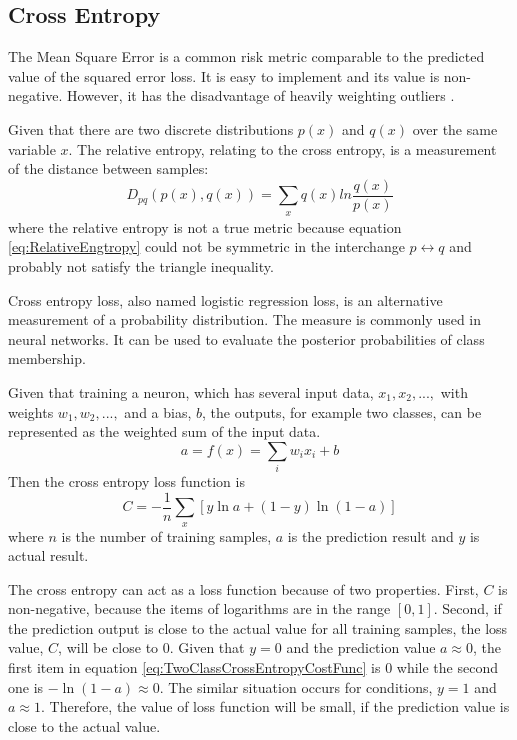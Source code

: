 \subsection{Cross Entropy}

The Mean Square Error is a common risk metric comparable to the predicted value of the squared error loss. It is easy to implement and its value is non-negative. However, it has the disadvantage of heavily weighting outliers \citep{bermejo2001oriented}.

Given that there are two discrete distributions $p(x)$ and $q(x)$ over the same variable $x$. The relative entropy, relating to the cross entropy, is a measurement of the distance between samples:
\begin{equation}\label{eq:RelativeEngtropy}
D_{pq}(p(x), q(x)) = \sum_{\substack{x}}q(x)ln\frac{q(x)}{p(x)}
\end{equation}
where the relative entropy is not a true metric because equation \ref{eq:RelativeEngtropy} could not be symmetric in the interchange $p \leftrightarrow q$ and probably not satisfy the triangle inequality.

Cross entropy loss, also named logistic regression loss, is an alternative measurement of a probability distribution. The measure is commonly used in neural networks. It can be used to evaluate the posterior probabilities of class membership.

Given that training a neuron, which has several input data, $x_{1}, x_{2},...,$ with weights $w_{1}, w_{2},...,$ and a bias, $b$, the outputs, for example two classes, can be represented as the weighted sum of the input data.
\begin{equation}\label{eq:EquationNN}
a = f(x) = \sum_{i}w_{i}x_{i} + b
\end{equation}
Then the cross entropy loss function is
\begin{equation}\label{eq:TwoClassCrossEntropyCostFunc}
C = -\frac{1}{n} \sum_x \left[y \ln a + (1-y ) \ln (1-a) \right]
\end{equation}
where $n$ is the number of training samples, $a$ is the prediction result and $y$ is actual result.

The cross entropy can act as a loss function because of two properties. First, $C$ is non-negative, because the items of logarithms are in the range $[0,1]$. Second, if the prediction output is close to the actual value for all training samples, the loss value, $C$, will be close to $0$. Given that $y = 0$ and the prediction value $a \approx 0$, the first item in equation \ref{eq:TwoClassCrossEntropyCostFunc} is $0$ while the second one is $-\ln(1-a) \approx 0$. The similar situation occurs for conditions, $y = 1$ and $a \approx 1$. Therefore, the value of loss function will be small, if the prediction value is close to the actual value.

